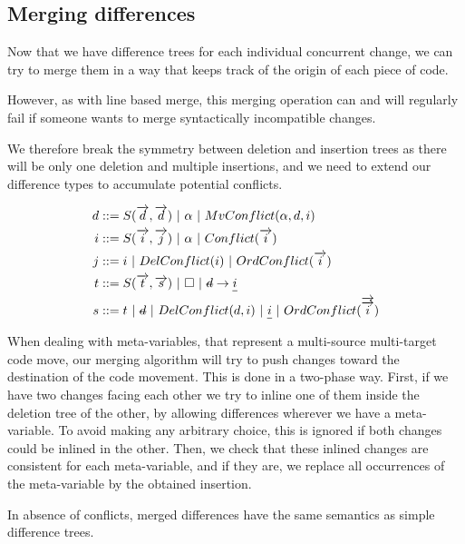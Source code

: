 \documentclass[a4paper,10pt]{article}
\newcommand{\typsep}{\ |\ }
\begin{document}
\subsection{Merging differences}
Now that we have difference trees for each individual concurrent change, we can try to merge them in a way that keeps track of the origin of each piece of code.

However, as with line based merge, this merging operation can and will regularly fail if someone wants to merge syntactically incompatible changes.

We therefore break the symmetry between deletion and insertion trees as there will be only one deletion and multiple insertions, and we need to extend our difference types to accumulate potential conflicts.

\begin{align*}
d &::= S(\overrightarrow{d}, \overrightarrow{d}) \typsep \alpha \typsep MvConflict(\alpha, d, i) \\
i &::= S(\overrightarrow{i}, \overrightarrow{j}) \typsep \alpha \typsep Conflict(\overrightarrow{i})\\
j &::= i \typsep DelConflict(i) \typsep OrdConflict(\overrightarrow{i})\\
t &::= S(\overrightarrow{t}, \overrightarrow{s}) \typsep \square \typsep  \text{\st{$d$}} \rightarrow \text{\ul{$i$}}\\
s &::= t \typsep \text{\st{$d$}} \typsep DelConflict(d, i) \typsep \text{\ul{$i$}} \typsep OrdConflict(\overrightarrow{\overrightarrow{i}})\\
\end{align*}

When dealing with meta-variables, that represent a multi-source multi-target code move, our merging algorithm will try to push changes toward the destination of the code movement.
This is done in a two-phase way. First, if we have two changes facing each other we try to inline one of them inside the deletion tree of the other, by allowing differences wherever we have a meta-variable. To avoid making any arbitrary choice, this is ignored if both changes could be inlined in the other. Then, we check that these inlined changes are consistent for each meta-variable, and if they are, we replace all occurrences of the meta-variable by the obtained insertion.

In absence of conflicts, merged differences have the same semantics as simple difference trees.
\end{document}
